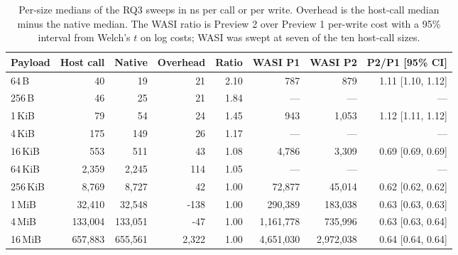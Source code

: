 \begin{table}[t]
\caption{Per-size medians of the RQ3 sweeps in ns per call or per write. Overhead is the host-call median minus the native median. The WASI ratio is Preview 2 over Preview 1 per-write cost with a 95\% interval from Welch's $t$ on log costs; WASI was swept at seven of the ten host-call sizes.}\label{tab:rq3_sweep}
\footnotesize
\setlength{\tabcolsep}{4pt}%
\begin{adjustbox}{max width=\textwidth}%
\begin{tabular}{lrrrrrrr}
\toprule
Payload & Host call & Native & Overhead & Ratio & WASI P1 & WASI P2 & P2/P1 [95\% CI] \\
\midrule
64\,B & 40 & 19 & 21 & 2.10 & 787 & 879 & 1.11 [1.10, 1.12] \\
256\,B & 46 & 25 & 21 & 1.84 & --- & --- & --- \\
1\,KiB & 79 & 54 & 24 & 1.45 & 943 & 1,053 & 1.12 [1.11, 1.12] \\
4\,KiB & 175 & 149 & 26 & 1.17 & --- & --- & --- \\
16\,KiB & 553 & 511 & 43 & 1.08 & 4,786 & 3,309 & 0.69 [0.69, 0.69] \\
64\,KiB & 2,359 & 2,245 & 114 & 1.05 & --- & --- & --- \\
256\,KiB & 8,769 & 8,727 & 42 & 1.00 & 72,877 & 45,014 & 0.62 [0.62, 0.62] \\
1\,MiB & 32,410 & 32,548 & -138 & 1.00 & 290,389 & 183,038 & 0.63 [0.63, 0.63] \\
4\,MiB & 133,004 & 133,051 & -47 & 1.00 & 1,161,778 & 735,996 & 0.63 [0.63, 0.64] \\
16\,MiB & 657,883 & 655,561 & 2,322 & 1.00 & 4,651,030 & 2,972,038 & 0.64 [0.64, 0.64] \\
\bottomrule
\end{tabular}%
\end{adjustbox}
\end{table}
